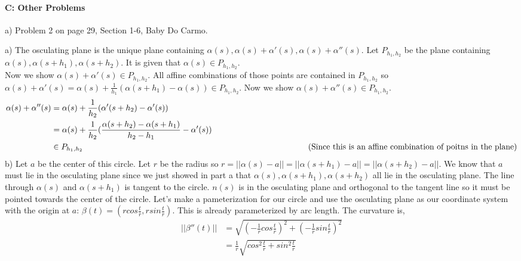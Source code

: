 \documentclass[12pt,letterpaper,boxed]{hmcpset}
\newcommand{\cmmt}[1]{%
  \text{\phantom{(#1)}} \tag{#1}
}
\begin{document}
\paragraph{C: Other Problems}
\begin{itemize}
{\item a) Problem 2 on page 29, Section 1-6, Baby Do Carmo.}
\begin{solution}
  a) The osculating plane is the unique plane containing $\alpha(s), \alpha(s) + \alpha'(s), \alpha(s)
  + \alpha''(s)$. Let $P_{h_1, h_2}$ be the plane containing $\alpha(s), \alpha(s + h_1), \alpha(s +
  h_2)$.  It is given that $\alpha(s) \in P_{h_1, h_2}$.\\
  Now we show $\alpha(s) + \alpha'(s) \in P_{h_1, h_2}$. All affine combinations of those points are contained in $P_{h_1, h_2}$ so
  $\alpha(s) + \alpha'(s) = \alpha(s) + \frac{1}{h_1}(\alpha(s + h_1) - \alpha(s)) \in P_{h_1, h_2}$. 
  Now we show $\alpha(s) + \alpha''(s) \in P_{h_1, h_2}$.
  \begin{align*}
    \alpha(s) + \alpha''(s) &= \alpha(s) + \frac{1}{h_2}(\alpha'(s + h_2) - \alpha'(s)) \\
                  &= \alpha(s) + \frac{1}{h_2}(\frac{\alpha(s + h_2) - \alpha(s + h_1)}{h_2 - h_1} - \alpha'(s)) \\
                  &\in P_{h_1, h_2} \cmmt{Since this is an affine combination of poitns in the plane} \\
  \end{align*}
  b) Let $a$ be the center of this circle. Let $r$ be the radius so $r = ||\alpha(s)
  - a|| = ||\alpha(s + h_1) - a|| = ||\alpha(s + h_2) - a||$. We know that $a$ must lie in
  the osculating plane since we just showed in part a that $\alpha(s), \alpha(s + h_1),
  \alpha(s + h_2)$ all lie in the osculating plane. The line through $\alpha(s)$ and $\alpha(s
  + h_1)$ is tangent to the circle. $n(s)$  is in the osculating plane and
  orthogonal to the tangent line so it must be pointed towards the center of the
  circle. Let's make a pameterization for our circle and use the osculating
  plane as our coordinate system with the origin at $a$: $\beta(t) = (r cos
  \frac{t}{r}, r sin \frac{t}{r})$. This is already parameterized by arc length.
  The curvature is,
\begin{align*}
  ||\beta''(t)|| &= \sqrt{(-\frac{1}{r} cos \frac{t}{r})^2 +
    (-\frac{1}{r} sin \frac{t}{r})^2} \\
             &= \frac{1}{r} \sqrt{cos^2 \frac{t}{r} + sin^2 \frac{t}{r}} \\

\end{align*}
\end{solution}
\end{itemize}
\end{document}
